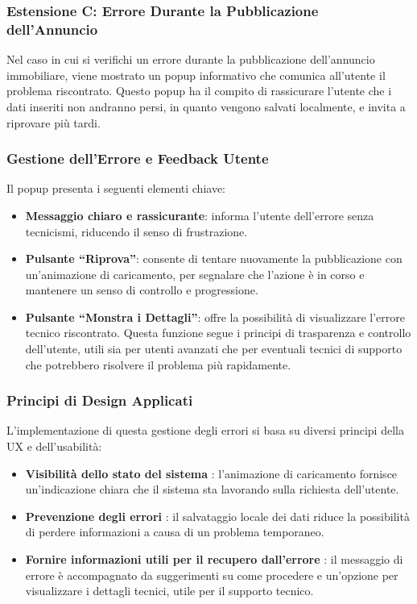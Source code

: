 \clearpage
\newpage
\subsubsection{Estensione C: Errore Durante la Pubblicazione dell'Annuncio}

Nel caso in cui si verifichi un errore durante la pubblicazione dell'annuncio immobiliare, viene mostrato un popup informativo che comunica all'utente il problema riscontrato. Questo popup ha il compito di rassicurare l'utente che i dati inseriti non andranno persi, in quanto vengono salvati localmente, e invita a riprovare più tardi.

\subsubsection{Gestione dell'Errore e Feedback Utente}
Il popup presenta i seguenti elementi chiave:
\begin{itemize}
    \item \textbf{Messaggio chiaro e rassicurante}: informa l'utente dell'errore senza tecnicismi, riducendo il senso di frustrazione.
    \item \textbf{Pulsante “Riprova”}: consente di tentare nuovamente la pubblicazione con un'animazione di caricamento, per segnalare che l'azione è in corso e mantenere un senso di controllo e progressione.
    \item \textbf{Pulsante “Monstra i Dettagli”}: offre la possibilità di visualizzare l'errore tecnico riscontrato. Questa funzione segue i principi di trasparenza e controllo dell'utente, utili sia per utenti avanzati che per eventuali tecnici di supporto che potrebbero risolvere il problema più rapidamente.
\end{itemize}

\subsubsection{Principi di Design Applicati}
L'implementazione di questa gestione degli errori si basa su diversi principi della UX e dell'usabilità:
\begin{itemize}
    \item \textbf{Visibilità dello stato del sistema} \cite{nielsen1995}: l'animazione di caricamento fornisce un'indicazione chiara che il sistema sta lavorando sulla richiesta dell'utente.
    \item \textbf{Prevenzione degli errori} \cite{nielsen1995}: il salvataggio locale dei dati riduce la possibilità di perdere informazioni a causa di un problema temporaneo.
    \item \textbf{Fornire informazioni utili per il recupero dall'errore} \cite{nielsen1995}: il messaggio di errore è accompagnato da suggerimenti su come procedere e un'opzione per visualizzare i dettagli tecnici, utile per il supporto tecnico.
\end{itemize}

